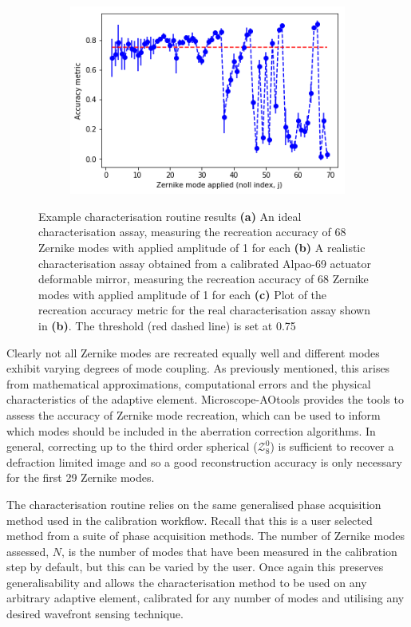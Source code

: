 \begin{figure}[h]
	\begin{subfigure}{0.9\textwidth}
		\centering
		\includegraphics[width=0.6\linewidth, scale=0.5]{./images/real_characterisation_assay_plot_metric_errorbar.png}
		\caption{}
		\label{fig:real_characterisation_assay_plot_metric_errorbar}
	\end{subfigure}
	\caption[Example characterisation routine results]{Example characterisation routine results \textbf{(a)} An ideal characterisation assay, measuring the recreation accuracy of 68 Zernike modes with applied amplitude of 1 for each \textbf{(b)} A realistic characterisation assay obtained from a calibrated Alpao-69 actuator deformable mirror, measuring the recreation accuracy of 68 Zernike modes with applied amplitude of 1 for each \textbf{(c)} Plot of the recreation accuracy metric for the real characterisation assay shown in \textbf{(b)}. The threshold (red dashed line) is set at 0.75}
	\label{fig:characterisation_assay_results}
\end{figure}

Clearly not all Zernike modes are recreated equally well and  different modes exhibit varying degrees of mode coupling. As previously mentioned, this arises from mathematical approximations,
computational errors and the physical characteristics of the adaptive element. Microscope-AOtools provides the tools to assess the accuracy of Zernike mode recreation, which can be used to inform which modes should be included in the aberration correction algorithms. In general, correcting up to the third order spherical ($\mathcal{Z}_{8}^{0}$) is sufficient to recover a defraction limited image and so a good reconstruction accuracy is only necessary for the first 29 Zernike modes\cite{antonello2014optimisation}.

The characterisation routine relies on the same generalised phase acquisition method used in the calibration workflow. Recall that this is a user selected method from a suite of phase acquisition methods. The number of Zernike modes assessed, $N$, is the number of modes that have been measured in the calibration step by default, but this can be varied by the user. Once again this preserves generalisability and allows the characterisation method to be used on any arbitrary adaptive element, calibrated for any number of modes and utilising any desired wavefront sensing technique.

